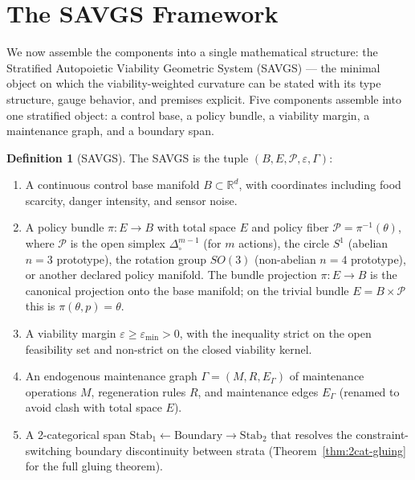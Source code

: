 \documentclass[11pt,a4paper]{article}
\theoremstyle{plain}
\theoremstyle{definition}
\newtheorem{definition}[theorem]{Definition}
\theoremstyle{remark}
\newcommand{\RR}{\mathbb{R}}
\newcommand{\Stab}{\mathrm{Stab}}
\begin{document}

\section{The SAVGS Framework}\label{sec:savgs}

We now assemble the components into a single mathematical
structure: the Stratified Autopoietic Viability Geometric System
(SAVGS) --- the minimal object on which the viability-weighted
curvature can be stated with its type structure, gauge behavior,
and premises explicit. Five components assemble into one stratified
object: a control base, a policy bundle, a viability margin, a
maintenance graph, and a boundary span.

\begin{definition}[SAVGS]
\label{def:savgs}
The SAVGS is the tuple $(B, E, \mathcal P, \varepsilon, \Gamma)$:
\begin{enumerate}[leftmargin=*,itemsep=2pt]
\item A continuous control base manifold $B \subset \RR^d$, with
coordinates including food
scarcity, danger intensity, and sensor noise.
\item A policy bundle $\pi : E \to B$ with total space $E$ and policy
fiber $\mathcal P = \pi^{-1}(\theta)$, where $\mathcal P$ is the open
simplex $\Delta^{m-1}_\circ$ (for $m$ actions), the circle $S^1$
(abelian $n=3$ prototype), the rotation group $SO(3)$ (non-abelian
$n=4$ prototype), or another declared policy manifold. The bundle
projection $\pi : E \to B$ is the canonical projection onto the base
manifold; on the trivial bundle $E = B \times \mathcal P$ this is
$\pi(\theta, p) = \theta$.
\item A viability margin $\varepsilon\geq\varepsilon_{\min}>0$, with
the inequality strict on the open feasibility set and non-strict on the
closed viability kernel.
\item An endogenous maintenance graph $\Gamma=(M, R, E_\Gamma)$ of
maintenance operations $M$, regeneration rules $R$, and maintenance
edges $E_\Gamma$ (renamed to avoid clash with total space $E$).
\item A 2-categorical span $\Stab_1\leftarrow\mathrm{Boundary}\rightarrow
\Stab_2$ that resolves the constraint-switching boundary discontinuity
between strata (Theorem~\ref{thm:2cat-gluing} for
the full gluing theorem).
\end{enumerate}
\end{definition}
\end{document}
